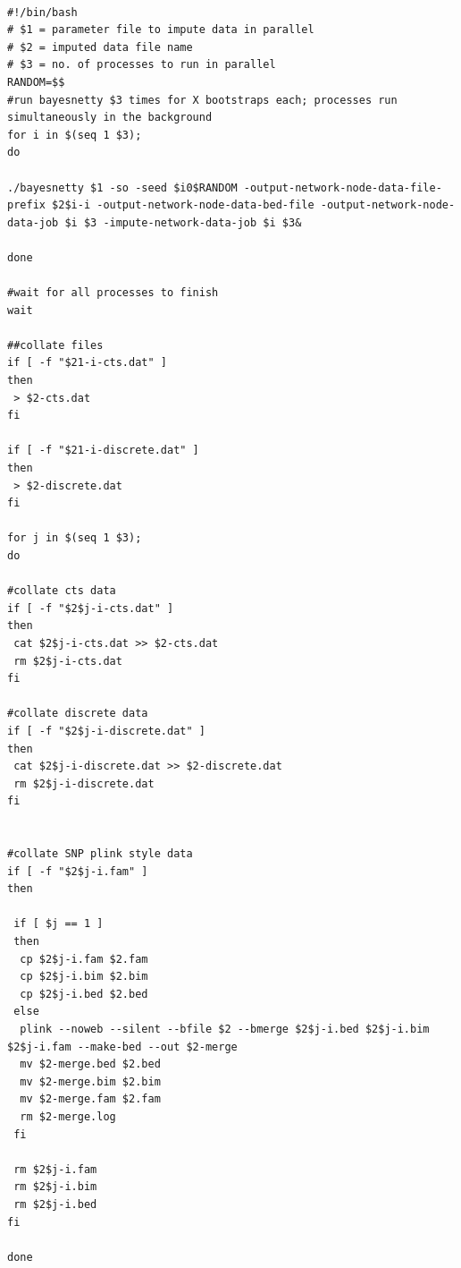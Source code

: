 \documentclass[a4paper,12pt]{article}
\begin{document}
\vspace{0.35cm} \begin{lstlisting}

#!/bin/bash                                                                                                                                                                                       
# $1 = parameter file to impute data in parallel
# $2 = imputed data file name
# $3 = no. of processes to run in parallel                                                                                                                                                       
RANDOM=$$
#run bayesnetty $3 times for X bootstraps each; processes run simultaneously in the background                                                                
for i in $(seq 1 $3);
do

./bayesnetty $1 -so -seed $i0$RANDOM -output-network-node-data-file-prefix $2$i-i -output-network-node-data-bed-file -output-network-node-data-job $i $3 -impute-network-data-job $i $3&

done

#wait for all processes to finish
wait

##collate files                                                                                                                                                                                   
if [ -f "$21-i-cts.dat" ]
then
 > $2-cts.dat
fi

if [ -f "$21-i-discrete.dat" ]
then
 > $2-discrete.dat
fi

for j in $(seq 1 $3);
do

#collate cts data
if [ -f "$2$j-i-cts.dat" ]
then
 cat $2$j-i-cts.dat >> $2-cts.dat
 rm $2$j-i-cts.dat
fi

#collate discrete data
if [ -f "$2$j-i-discrete.dat" ]
then
 cat $2$j-i-discrete.dat >> $2-discrete.dat
 rm $2$j-i-discrete.dat
fi


#collate SNP plink style data
if [ -f "$2$j-i.fam" ]
then

 if [ $j == 1 ]
 then
  cp $2$j-i.fam $2.fam
  cp $2$j-i.bim $2.bim
  cp $2$j-i.bed $2.bed
 else
  plink --noweb --silent --bfile $2 --bmerge $2$j-i.bed $2$j-i.bim $2$j-i.fam --make-bed --out $2-merge
  mv $2-merge.bed $2.bed
  mv $2-merge.bim $2.bim
  mv $2-merge.fam $2.fam
  rm $2-merge.log
 fi

 rm $2$j-i.fam
 rm $2$j-i.bim
 rm $2$j-i.bed
fi

done

\end{lstlisting} \vspace{0.35cm}
\end{document}
